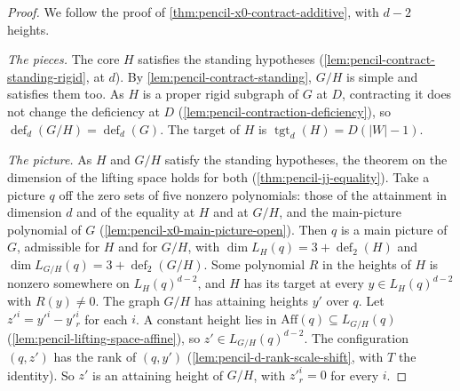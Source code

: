 \begin{proof}
  \leanok
  We follow the proof of \cref{thm:pencil-x0-contract-additive}, with
  $d - 2$ heights.

  \emph{The pieces.} The core $H$ satisfies the standing hypotheses
  (\cref{lem:pencil-contract-standing-rigid}, at $d$). By
  \cref{lem:pencil-contract-standing}, $G/H$ is simple and satisfies them
  too. As $H$ is a proper rigid subgraph of $G$ at $D$, contracting it
  does not change the deficiency at $D$
  (\cref{lem:pencil-contraction-deficiency}), so
  $\operatorname{def}_d(G/H) = \operatorname{def}_d(G)$. The target of
  $H$ is $\operatorname{tgt}_d(H) = D(|W| - 1)$.

  \emph{The picture.} As $H$ and $G/H$ satisfy the standing hypotheses,
  the theorem on the dimension of the lifting space holds for both
  (\cref{thm:pencil-jj-equality}). Take a picture $q$ off the zero sets of
  five nonzero polynomials: those of the attainment in dimension $d$ and
  of the equality at $H$ and at $G/H$, and the main-picture polynomial of
  $G$ (\cref{lem:pencil-x0-main-picture-open}). Then $q$ is a main picture
  of $G$, admissible for $H$ and for $G/H$, with
  $\dim L_H(q) = 3 + \operatorname{def}_2(H)$ and
  $\dim L_{G/H}(q) = 3 + \operatorname{def}_2(G/H)$. Some polynomial $R$
  in the heights of $H$ is nonzero somewhere on $L_H(q)^{d-2}$, and $H$
  has its target at every $y \in L_H(q)^{d-2}$ with $R(y) \neq 0$. The
  graph $G/H$ has attaining heights $y'$ over $q$. Let
  $z'^i = y'^i - y'^i_r$ for each $i$. A constant height lies in
  $\mathrm{Aff}(q) \subseteq L_{G/H}(q)$
  (\cref{lem:pencil-lifting-space-affine}), so
  $z' \in L_{G/H}(q)^{d-2}$. The configuration $(q, z')$ has the rank of
  $(q, y')$ (\cref{lem:pencil-d-rank-scale-shift}, with $T$ the
  identity). So $z'$ is an attaining height of $G/H$, with $z'^i_r = 0$
  for every $i$.


\end{proof}
